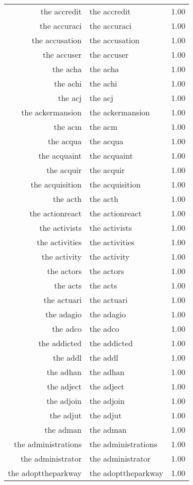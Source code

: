 \begin{table}[ht]
\begin{tabular}{rlr}
  the accredit & the accredit & 1.00 \\ 
  the accuraci & the accuraci & 1.00 \\ 
  the accusation & the accusation & 1.00 \\ 
  the accuser & the accuser & 1.00 \\ 
  the acha & the acha & 1.00 \\ 
  the achi & the achi & 1.00 \\ 
  the acj & the acj & 1.00 \\ 
  the ackermansion & the ackermansion & 1.00 \\ 
  the acm & the acm & 1.00 \\ 
  the acqua & the acqua & 1.00 \\ 
  the acquaint & the acquaint & 1.00 \\ 
  the acquir & the acquir & 1.00 \\ 
  the acquisition & the acquisition & 1.00 \\ 
  the acth & the acth & 1.00 \\ 
  the actionreact & the actionreact & 1.00 \\ 
  the activists & the activists & 1.00 \\ 
  the activities & the activities & 1.00 \\ 
  the activity & the activity & 1.00 \\ 
  the actors & the actors & 1.00 \\ 
  the acts & the acts & 1.00 \\ 
  the actuari & the actuari & 1.00 \\ 
  the adagio & the adagio & 1.00 \\ 
  the adco & the adco & 1.00 \\ 
  the addicted & the addicted & 1.00 \\ 
  the addl & the addl & 1.00 \\ 
  the adhan & the adhan & 1.00 \\ 
  the adject & the adject & 1.00 \\ 
  the adjoin & the adjoin & 1.00 \\ 
  the adjut & the adjut & 1.00 \\ 
  the adman & the adman & 1.00 \\ 
  the administrations & the administrations & 1.00 \\ 
  the administrator & the administrator & 1.00 \\ 
  the adopttheparkway & the adopttheparkway & 1.00 \\ 

\end{tabular}
\end{table}
